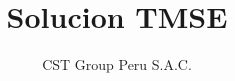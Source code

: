 \documentclass{article}
\begin{document}
\newcommand{\sectionTitle}{Default_name}


\title{Solucion TMSE}
\author{CST Group Peru S.A.C.}

\maketitle

\tableofcontents
\newpage
\listoffigures
\newpage
\listoftables

\newpage
\newpage

\newpage

\newpage

\newpage

\end{document}
